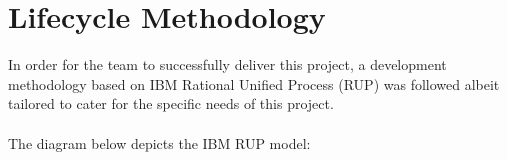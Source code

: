 \documentclass[12pt]{article} %
\begin{document}
	
	
	
	
	
	
	
	
	


	
	
	
	
	
	
	
	

	
	
	\section{Lifecycle Methodology}
	
	
	In order for the team to successfully deliver this project, a development methodology based on IBM Rational Unified Process (RUP) was followed albeit tailored to cater for the specific needs of this project.\\
	\\
	The diagram below depicts the IBM RUP model:
	
\end{document}
